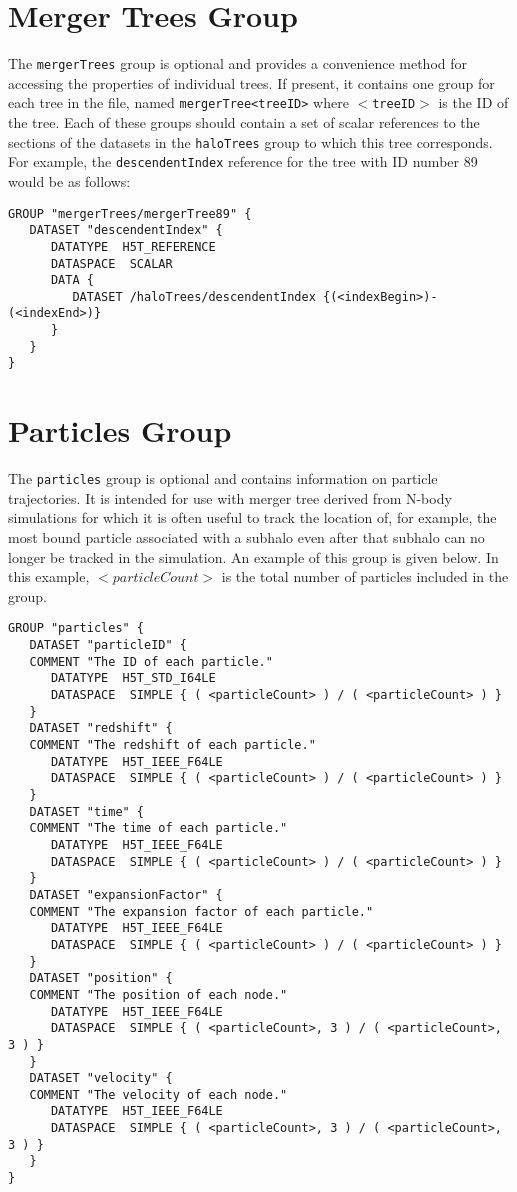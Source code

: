 \section{Merger Trees Group}

The {\tt mergerTrees} group is optional and provides a convenience method for accessing the properties of individual trees. If present, it contains one group for each tree in the file, named {\tt mergerTree<treeID>} where {\tt $<$treeID$>$} is the ID of the tree. Each of these groups should contain a set of scalar references to the sections of the datasets in the {\tt haloTrees} group to which this tree corresponds. For example, the {\tt descendentIndex} reference for the tree with ID number 89 would be as follows:

\begin{verbatim}
GROUP "mergerTrees/mergerTree89" {
   DATASET "descendentIndex" {
      DATATYPE  H5T_REFERENCE
      DATASPACE  SCALAR
      DATA {
         DATASET /haloTrees/descendentIndex {(<indexBegin>)-(<indexEnd>)}
      }
   }
}
\end{verbatim}

\section{Particles Group}

The {\tt particles} group is optional and contains information on particle trajectories. It is intended for use with merger tree derived from N-body simulations for which it is often useful to track the location of, for example, the most bound particle associated with a subhalo even after that subhalo can no longer be tracked in the simulation. An example of this group is given below. In this example, {\tt $<particleCount>$} is the total number of particles included in the group.

\begin{verbatim}
GROUP "particles" {
   DATASET "particleID" {
   COMMENT "The ID of each particle."
      DATATYPE  H5T_STD_I64LE
      DATASPACE  SIMPLE { ( <particleCount> ) / ( <particleCount> ) }
   }
   DATASET "redshift" {
   COMMENT "The redshift of each particle."
      DATATYPE  H5T_IEEE_F64LE
      DATASPACE  SIMPLE { ( <particleCount> ) / ( <particleCount> ) }
   }
   DATASET "time" {
   COMMENT "The time of each particle."
      DATATYPE  H5T_IEEE_F64LE
      DATASPACE  SIMPLE { ( <particleCount> ) / ( <particleCount> ) }
   }
   DATASET "expansionFactor" {
   COMMENT "The expansion factor of each particle."
      DATATYPE  H5T_IEEE_F64LE
      DATASPACE  SIMPLE { ( <particleCount> ) / ( <particleCount> ) }
   }
   DATASET "position" {
   COMMENT "The position of each node."
      DATATYPE  H5T_IEEE_F64LE
      DATASPACE  SIMPLE { ( <particleCount>, 3 ) / ( <particleCount>, 3 ) }
   }
   DATASET "velocity" {
   COMMENT "The velocity of each node."
      DATATYPE  H5T_IEEE_F64LE
      DATASPACE  SIMPLE { ( <particleCount>, 3 ) / ( <particleCount>, 3 ) }
   }
}
\end{verbatim}

